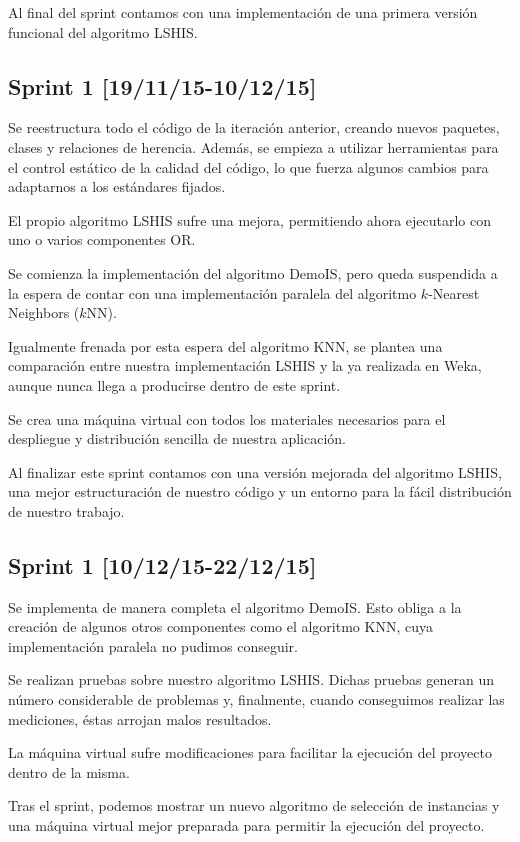 Al final del sprint contamos con una implementación de una primera versión funcional del algoritmo LSHIS.

\subsection{Sprint 1 [19/11/15-10/12/15]}

Se reestructura todo el código de la iteración anterior, creando nuevos paquetes, clases y relaciones de herencia. Además, se empieza a utilizar herramientas para el control estático de la calidad del código, lo que fuerza algunos cambios para adaptarnos a los estándares fijados.

El propio algoritmo LSHIS sufre una mejora, permitiendo ahora ejecutarlo con uno o varios componentes OR.

Se comienza la implementación del algoritmo DemoIS, pero queda suspendida a la espera de contar con una implementación paralela del algoritmo $k$-Nearest Neighbors ($k$NN).

Igualmente frenada por esta espera del algoritmo KNN, se plantea una comparación entre nuestra implementación LSHIS y la ya realizada en Weka, aunque nunca llega a producirse dentro de este sprint.

Se crea una máquina virtual con todos los materiales necesarios para el despliegue y distribución sencilla de nuestra aplicación.

Al finalizar este sprint contamos con una versión mejorada del algoritmo LSHIS, una mejor estructuración de nuestro código y un entorno para la fácil distribución de nuestro trabajo.

\subsection{Sprint 1 [10/12/15-22/12/15]}

Se implementa de manera completa el algoritmo DemoIS. Esto obliga a la creación de algunos otros componentes como el algoritmo KNN, cuya implementación paralela no pudimos conseguir.

Se realizan pruebas sobre nuestro algoritmo LSHIS. Dichas pruebas generan un número considerable de problemas y, finalmente, cuando conseguimos realizar las mediciones, éstas arrojan malos resultados.

La máquina virtual sufre modificaciones para facilitar la ejecución del proyecto dentro de la misma.

Tras el sprint, podemos mostrar un nuevo algoritmo de selección de instancias y una máquina virtual mejor preparada para permitir la ejecución del proyecto.

